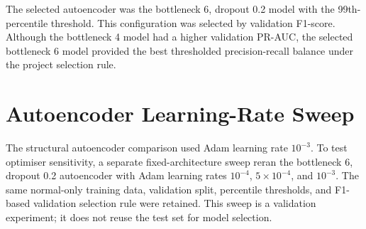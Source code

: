 \documentclass[12pt,a4paper]{report}
\begin{document}
\begin{table}[htbp]
    \centering
    \caption{Best validation result for each autoencoder configuration.}
\end{table}

The selected autoencoder was the bottleneck 6, dropout 0.2 model with the 99th-percentile threshold. This configuration was selected by validation F1-score. Although the bottleneck 4 model had a higher validation PR-AUC, the selected bottleneck 6 model provided the best thresholded precision-recall balance under the project selection rule.

\section{Autoencoder Learning-Rate Sweep}

The structural autoencoder comparison used Adam learning rate $10^{-3}$. To test optimiser sensitivity, a separate fixed-architecture sweep reran the bottleneck 6, dropout 0.2 autoencoder with Adam learning rates $10^{-4}$, $5\times10^{-4}$, and $10^{-3}$. The same normal-only training data, validation split, percentile thresholds, and F1-based validation selection rule were retained. This sweep is a validation experiment; it does not reuse the test set for model selection.

\begin{table}[htbp]
    \centering
    \caption{Best validation result for the fixed-architecture autoencoder learning-rate sweep.}
\end{table}
\end{document}

